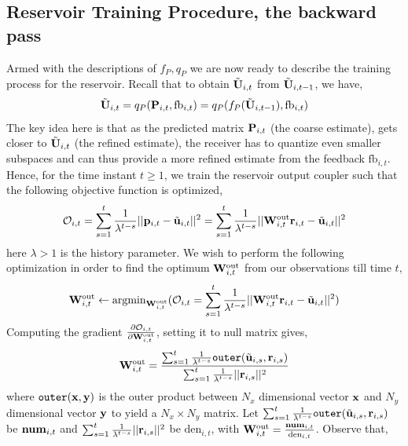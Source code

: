 \documentclass[conference]{IEEEtran}
\begin{document}
\subsection{Reservoir Training Procedure, the backward pass}
\label{train}
Armed with the descriptions of $f_P, q_P$ we are now ready to describe the training process for the reservoir.
Recall that to obtain $\tilde{{\bf U}}_{i,t}$ from  $\tilde{{\bf U}}_{i,t-1}$, we have,
\begin{equation}
\tilde{\bU}_{i,t}=q_P(\bP_{i,t},\text{fb}_{i,t})=q_P(f_P(\tilde{\bU}_{i,t-1}),\text{fb}_{i,t})
\label{fpqp}
\end{equation}
The key idea here is that as the predicted matrix ${\bf P}_{i,t}$ (the coarse estimate), gets closer to $\tilde{{\bf U}}_{i,t}$ (the refined estimate), the receiver has to quantize even smaller subspaces and can thus provide a more refined estimate from the feedback $\text{fb}_{i,t}$.
Hence, for the time instant $t\geq1$, we train the reservoir output coupler such that the following objective function is optimized,
\begin{equation}
\mathcal{O}_{i,t}=\sum_{s=1}^{t}\frac{1}{\lambda^{t-s}}||{\bf p}_{i,t}-\tilde{{\bf u}}_{i,t}||^2=\sum_{s=1}^{t}\frac{1}{\lambda^{t-s}}||{\bf W}_{i,t}^{\text{out}}{\bf r}_{i,t}-\tilde{{\bf u}}_{i,t}||^2
\end{equation}
here $\lambda>1$ is the history parameter. We wish to perform the following optimization in order to find the optimum ${\bf W}_{i,t}^{\text{out}}$ from our observations till time $t$,
\begin{equation}
{\bf W}_{i,t}^{\text{out}}\gets\text{argmin}_{{\bf W}_{i,t}^{\text{out}}}(\mathcal{O}_{i,t}=\sum_{s=1}^{t}\frac{1}{\lambda^{t-s}}||{\bf W}_{i,t}^{\text{out}}{\bf r}_{i,t}-\tilde{{\bf u}}_{i,t}||^2)
\end{equation}
Computing the gradient $\frac{\partial \mathcal{O}_{i,t}}{\partial {\bf W}_{i,t}^{\text{out}}}$, setting it to null matrix gives,
\begin{equation}
\bW_{i,t}^{\text{out}}=\frac{\sum_{s=1}^{t}\frac{1}{\lambda^{t-s}}\texttt{outer}(\tilde{\bu}_{i,s},\br_{i,s})}{\sum_{s=1}^{t}\frac{1}{\lambda^{t-s}}||\br_{i,s}||^2}
\label{backpass}
\end{equation}
where $\texttt{outer}({\bf x},{\bf y})$ is the outer product between $N_x$ dimensional vector ${\bf x}$ and $N_y$ dimensional vector ${\bf y}$ to yield a $N_x\times N_y$ matrix. Let $\sum_{s=1}^{t}\frac{1}{\lambda^{t-s}}\texttt{outer}(\tilde{{\bf u}}_{i,s},{\bf r}_{i,s})$ be $\text{\textbf{num}}_{i,t}$ and $\sum_{s=1}^{t}\frac{1}{\lambda^{t-s}}||{\bf r}_{i,s}||^2$ be $\text{den}_{i,t}$, with ${\bf W}_{i,t}^{\text{out}}=\frac{\text{\textbf{num}}_{i,t}}{\text{den}_{i,t}}$. Observe that,
\end{document}

